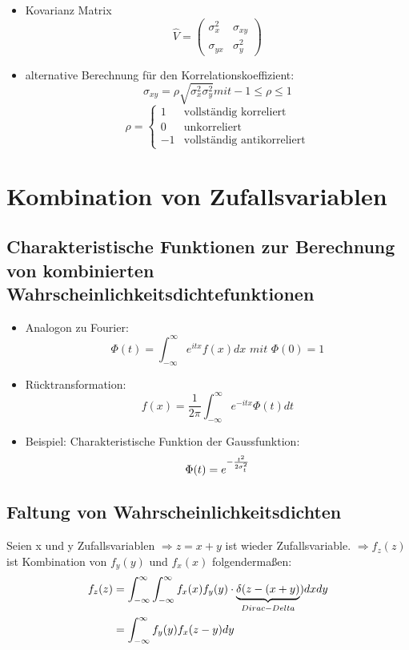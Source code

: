 \documentclass[10pt,a4paper]{article}
\begin{document}
\begin{itemize}
\item Kovarianz Matrix 
\begin{equation}
\hat{V}=
\begin{pmatrix}
\sigma^2_x & \sigma_{xy} \\ 
\sigma_{yx} & \sigma^2_y
\end{pmatrix} 
\end{equation}
\item alternative Berechnung für den Korrelationskoeffizient:
\begin{equation}
\sigma_{xy}=\rho \sqrt{\sigma^2_x\sigma^2_y} \textit{mit}  -1\le \rho \le 1
\end{equation}
\begin{equation}
\rho=
\begin{cases}
1 & \text{vollständig korreliert} \\
0 & \text{unkorreliert} \\
-1 & \text{vollständig antikorreliert}	
\end{cases}
\end{equation}
\end{itemize}

\newpage
\section{Kombination von Zufallsvariablen}
\subsection{Charakteristische Funktionen zur Berechnung von kombinierten Wahrscheinlichkeitsdichtefunktionen}
\begin{itemize}
\item Analogon zu Fourier:
\begin{equation}
\Phi(t)=\int^{\infty}_{-\infty}{e^{itx}f(x)dx}\textit{ mit }\Phi(0)=1
\end{equation}
\item Rücktransformation:
\begin{equation}
f(x)=\frac{1}{2\pi}\int^{\infty}_{-\infty}{e^{-itx}\Phi(t)dt}
\end{equation}
\item Beispiel: Charakteristische Funktion der Gaussfunktion:
\begin{equation}
\Phi(t)=e^{-\frac{t^2}{2\sigma^2_t}} \notag
\end{equation}
\end{itemize}

\subsection{Faltung von Wahrscheinlichkeitsdichten}
Seien x und y Zufallsvariablen $\Rightarrow z=x+y$ ist wieder Zufallsvariable. \newline
$\Rightarrow f_z(z)$ ist Kombination von $f_y(y)$ und $f_x(x)$ folgendermaßen:
\begin{align}
f_z(z)&=\int^{\infty}_{-\infty}\int^{\infty}_{-\infty}{f_x(x)f_y(y)\cdot \underbrace{\delta(z-(x+y)}_{Dirac-Delta} ) dxdy} \notag \\
&= \int^{\infty}_{-\infty}{f_y(y)f_x(z-y)dy}
\end{align}
\end{document}
